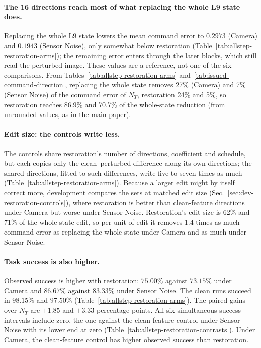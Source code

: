 



\paragraph{The 16 directions reach most of what replacing the whole L9 state does.}
Replacing the whole L9 state lowers the mean command error to $0.2973$ (Camera) and $0.1943$ (Sensor Noise), only somewhat below restoration (Table~\ref{tab:allstep-restoration-arms}); the remaining error enters through the later blocks, which still read the perturbed image. These values are a reference, not one of the six comparisons. From Tables~\ref{tab:allstep-restoration-arms} and~\ref{tab:issued-command-direction}, replacing the whole state removes 27\% (Camera) and 7\% (Sensor Noise) of the command error of $N_T$, restoration 24\% and 5\%, so restoration reaches 86.9\% and 70.7\% of the whole-state reduction (from unrounded values, as in the main paper).

\paragraph{Edit size: the controls write less.}
The controls share restoration's number of directions, coefficient and schedule, but each copies only the clean--perturbed difference along its own directions; the shared directions, fitted to such differences, write five to seven times as much (Table~\ref{tab:allstep-restoration-arms}). Because a larger edit might by itself correct more, development compares the sets at matched edit size (Sec.~\ref{sec:dev-restoration-controls}), where restoration is better than clean-feature directions under Camera but worse under Sensor Noise. Restoration's edit size is 62\% and 71\% of the whole-state edit, so per unit of edit it removes 1.4 times as much command error as replacing the whole state under Camera and as much under Sensor Noise.



\paragraph{Task success is also higher.}
Observed success is higher with restoration: $75.00\%$ against $73.15\%$ under Camera and $86.67\%$ against $83.33\%$ under Sensor Noise. The clean runs succeed in $98.15\%$ and $97.50\%$ (Table~\ref{tab:allstep-restoration-arms}). The paired gains over $N_T$ are $+1.85$ and $+3.33$ percentage points. All six simultaneous success intervals include zero, the one against the clean-feature control under Sensor Noise with its lower end at zero (Table~\ref{tab:allstep-restoration-contrasts}). Under Camera, the clean-feature control has higher observed success than restoration.

